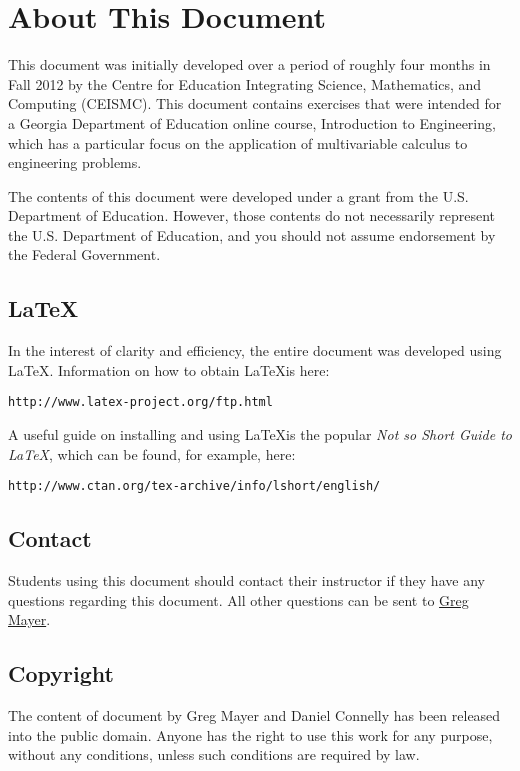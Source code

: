 \section*{About This Document}
This document was initially developed over a period of roughly four months in Fall 2012 by the Centre for Education Integrating Science, Mathematics, and Computing (CEISMC). This document contains exercises that were intended for a Georgia Department of Education online course, Introduction to Engineering, which has a particular focus on the application of multivariable calculus to engineering problems.

The contents of this document were developed under a grant from the U.S. Department of Education. However, those contents do not necessarily represent the U.S. Department of Education, and you should not assume endorsement by the Federal Government. 

\subsection*{\LaTeX}
In the interest of clarity and efficiency, the entire document was developed using \LaTeX. Information on how to obtain \LaTeX is here:
\begin{verbatim}
http://www.latex-project.org/ftp.html
\end{verbatim}
A useful guide on installing and using \LaTeX is the popular \textit{Not so Short Guide to \LaTeX}, which can be found, for example, here:
\begin{verbatim}
http://www.ctan.org/tex-archive/info/lshort/english/ 
\end{verbatim}

\subsection*{Contact}
Students using this document should contact their instructor if they have any questions regarding this document. All other questions can be sent to \href{mailto:gsmayer@gmail.com}{Greg Mayer}.

\subsection*{Copyright}
The content of \textit{\DocumentTitle}document by Greg Mayer and Daniel Connelly has been released into the public domain. Anyone has the right to use this work for any purpose, without any conditions, unless such conditions are required by law.